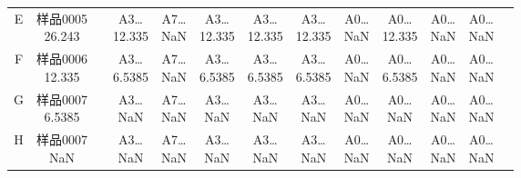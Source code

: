 \documentclass[UTF8,10pt,a4paper,fontset=fandol]{ctexart}
\begin{document}
\begin{center}
\begin{tabular}{c|cccccccccccc}
E & \shortstack{样品0005\\26.243} & & \shortstack{A3\ldots\\12.335} & \shortstack{A7\ldots\\NaN} & \shortstack{A3\ldots\\12.335} & \shortstack{A3\ldots\\12.335} & \shortstack{A3\ldots\\12.335} & \shortstack{A0\ldots\\NaN} & \shortstack{A0\ldots\\12.335} & \shortstack{A0\ldots\\NaN} & \shortstack{A0\ldots\\NaN} &\\
F & \shortstack{样品0006\\12.335} & & \shortstack{A3\ldots\\6.5385} & \shortstack{A7\ldots\\NaN} & \shortstack{A3\ldots\\6.5385} & \shortstack{A3\ldots\\6.5385} & \shortstack{A3\ldots\\6.5385} & \shortstack{A0\ldots\\NaN} & \shortstack{A0\ldots\\6.5385} & \shortstack{A0\ldots\\NaN} & \shortstack{A0\ldots\\NaN} &\\
G & \shortstack{样品0007\\6.5385} & & \shortstack{A3\ldots\\NaN} & \shortstack{A7\ldots\\NaN} & \shortstack{A3\ldots\\NaN} & \shortstack{A3\ldots\\NaN} & \shortstack{A3\ldots\\NaN} & \shortstack{A0\ldots\\NaN} & \shortstack{A0\ldots\\NaN} & \shortstack{A0\ldots\\NaN} & \shortstack{A0\ldots\\NaN} &\\
H & \shortstack{样品0007\\NaN} & & \shortstack{A3\ldots\\NaN} & \shortstack{A7\ldots\\NaN} & \shortstack{A3\ldots\\NaN} & \shortstack{A3\ldots\\NaN} & \shortstack{A3\ldots\\NaN} & \shortstack{A0\ldots\\NaN} & \shortstack{A0\ldots\\NaN} & \shortstack{A0\ldots\\NaN} & \shortstack{A0\ldots\\NaN} &\\
\end{tabular}
\end{center}
\end{document}

